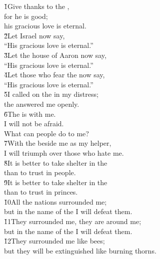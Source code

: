 \begin{poetry}
\poeml \v{1}Give thanks to the , \\
\poemll    for he is good; \\
\poemlll       his gracious love is eternal. \\
\poeml \v{2}Let Israel now say, \\
\poemll    ``His gracious love is eternal.'' \\
\poeml \v{3}Let the house of Aaron now say, \\
\poemll    ``His gracious love is eternal.'' \\
\poeml \v{4}Let those who fear the  now say, \\
\poemll    ``His gracious love is eternal.'' \\
\poeml \v{5}I called on the  in my distress; \\
\poemll    the  answered me openly. \\
\poeml \v{6}The  is with me. \\
\poemll    I will not be afraid. \\
\poemlll       What can people do to me? \\
\poeml \v{7}With the  beside me as my helper, \\
\poemll    I will triumph over those who hate me. \\
\poeml \v{8}It is better to take shelter in the  \\
\poemll    than to trust in people. \\
\poeml \v{9}It is better to take shelter in the  \\
\poemll    than to trust in princes. \\
\poeml \v{10}All the nations surrounded me; \\
\poemll    but in the name of the  I will defeat them. \\
\poeml \v{11}They surrounded me, they are around me; \\
\poemll    but in the name of the  I will defeat them. \\
\poeml \v{12}They surrounded me like bees; \\
\poemll    but they will be extinguished like burning thorns. \\

\end{poetry}
